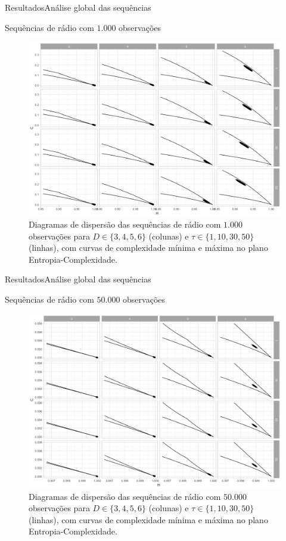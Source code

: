 \documentclass[10pt,xcolor={dvipsnames}]{beamer}
\begin{document}
\begin{frame}{Resultados}{Análise global das sequências}
\begin{block}{Sequências de rádio com $1.000$ observações}
	\begin{figure}[hbt]
		\centering
		\includegraphics[width=.65\linewidth]{ScatterAll_Radio_1k}
		\caption{Diagramas de dispersão das sequências de rádio com $1.000$ observações para $D\in\{3, 4, 5, 6\}$ (colunas) e $\tau\in\{1, 10, 30, 50\}$ (linhas), com curvas de complexidade mínima e máxima no plano Entropia-Complexidade.}\label{Fig:ScatterAll_Radio_1k}
	\end{figure}	
\end{block}
\end{frame}

\begin{frame}{Resultados}{Análise global das sequências}
\begin{block}{Sequências de rádio com $50.000$ observações}
	\begin{figure}[hbt]
		\centering
		\includegraphics[width=.65\linewidth]{ScatterAll_Radio_50k}
		\caption{Diagramas de dispersão das sequências de rádio com $50.000$ observações para $D\in\{3, 4, 5, 6\}$ (colunas) e $\tau\in\{1, 10, 30, 50\}$ (linhas), com curvas de complexidade mínima e máxima no plano Entropia-Complexidade.}\label{Fig:ScatterAll_Radio_50k}
	\end{figure}	
\end{block}
\end{frame}
\end{document}

